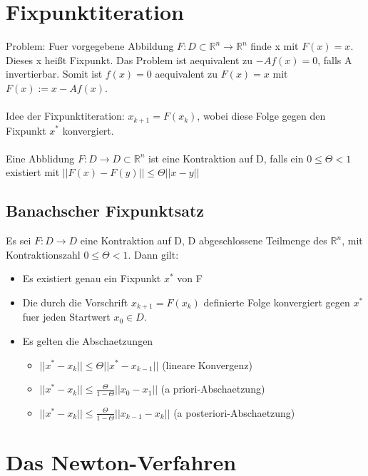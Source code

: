 \documentclass[a4paper]{scrreprt}
\begin{document}
\section{Fixpunktiteration}

Problem: Fuer vorgegebene Abbildung $F: D \subset \mathbb{R}^n \rightarrow \mathbb{R}^n$ finde x mit $F(x) = x$. Dieses x heißt Fixpunkt. Das Problem ist aequivalent zu $-Af(x) = 0$, falls A invertierbar. Somit ist $f(x) = 0$ aequivalent zu $F(x) = x$ mit $F(x) := x - Af(x)$.\\\\

Idee der Fixpunktiteration: $x_{k+1} = F(x_k)$, wobei diese Folge gegen den Fixpunkt $x^*$ konvergiert.\\\\

Eine Abblidung $F: D \rightarrow D \subset \mathbb{R}^n$ ist eine Kontraktion auf D, falls ein $0 \leq \Theta < 1$ existiert mit $||F(x) - F(y)|| \leq \Theta ||x-y||$

\subsection{Banachscher Fixpunktsatz}
Es sei $F: D \rightarrow D$ eine Kontraktion auf D, D abgeschlossene Teilmenge des $\mathbb{R}^n$, mit Kontraktionszahl $0 \leq \Theta < 1$. Dann gilt:
\begin{itemize}
	\item Es existiert genau ein Fixpunkt $x^*$ von F
	\item Die durch die Vorschrift $x_{k+1} = F(x_k)$ definierte Folge konvergiert gegen $x^*$ fuer jeden Startwert $x_0 \in D$.
	\item Es gelten die Abschaetzungen
		\begin{itemize}
			\item $||x^* - x_k|| \leq \Theta ||x^* - x_{k-1}||$ (lineare Konvergenz)
			\item $||x^* - x_k|| \leq \frac{\Theta}{1 - \Theta} ||x_0 - x_1||$ (a priori-Abschaetzung)
			\item $||x^* - x_k|| \leq \frac{\Theta}{1 - \Theta} ||x_{k-1} - x_k||$ (a posteriori-Abschaetzung)
		\end{itemize}
\end{itemize}

\section{Das Newton-Verfahren}
\end{document}
